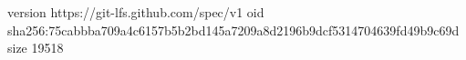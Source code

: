 version https://git-lfs.github.com/spec/v1
oid sha256:75cabbba709a4c6157b5b2bd145a7209a8d2196b9dcf5314704639fd49b9c69d
size 19518
